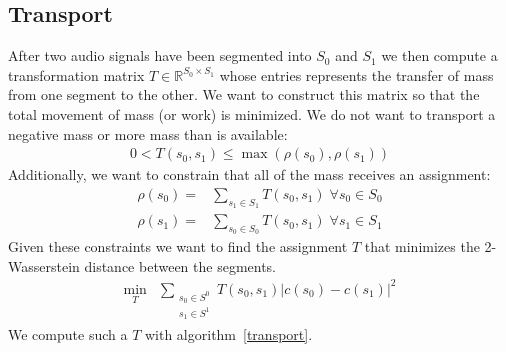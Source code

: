 \documentclass[12pt]{article}
\begin{document}
\subsection{Transport}

After two audio signals have been segmented into $S_0$ and $S_1$
we then compute a transformation matrix
$T\in \mathbb{R}^{S_0\times S_1}$
whose entries represents the transfer of mass from one segment to the other. 
We want to construct this matrix so that the total movement of mass (or work) is minimized.
We do not want to transport a negative mass or more mass than is available:
\begin{align}
  0 < T(s_0, s_1) \leq \max(\rho(s_0), \rho(s_1))
\end{align}
Additionally, we want to constrain that all of the mass receives an assignment:
\begin{align}
  \rho(s_0) = &\sum_{s_1\in S_1} T(s_0, s_1)
  \;
  \forall s_0\in S_0
  \\
  \rho(s_1) = &\sum_{s_0\in S_0} T(s_0, s_1)
  \;
  \forall s_1\in S_1
\end{align}
Given these constraints we want to find the assignment $T$ that minimizes the 2-Wasserstein distance between the segments.
\begin{align}
  \min_T &\sum_{\substack{s_0\in S^0\\ s_1\in S^1}} T(s_0, s_1)|c(s_0) - c(s_1)|^2
\end{align}
We compute such a $T$ with algorithm~\ref{transport}.
\end{document}
